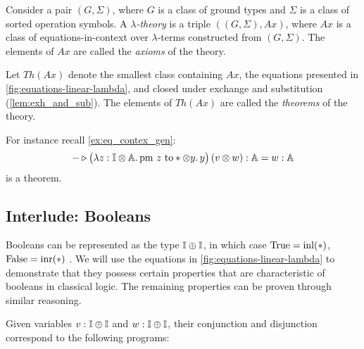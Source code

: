 


\begin{definition} \label{def:linear_lambda_theory}
  Consider a pair $(G, \Sigma)$, where $G$ is a class of ground types and $\Sigma$ is a class of sorted operation symbols. A \emph{$\lambda$-theory} is a triple $((G, \Sigma), Ax)$, where $Ax$ is a class of equations-in-context over $\lambda$-terms constructed from $(G, \Sigma)$. The elements of $Ax$ are called the \emph{axioms} of the theory.
\end{definition}


 Let $Th(Ax)$ denote the smallest class containing $Ax$, the equations presented in \autoref{fig:equations-linear-lambda}, and closed under exchange and substitution (\autoref{lem:exh_and_sub}). The elements of $Th(Ax)$ are called the \emph{theorems} of the theory.

 For instance recall \autoref{ex:eq_contex_gen}: 
 $$- \triangleright \big(\lambda z : \mathbb{I} \otimes \mathbb{A}. \, \text{pm } z \text{ to} * \otimes y. \, y\big) \, (v \otimes w): \mathbb{A} =  w : \mathbb{A} $$
 is a theorem.

\subsection{Interlude: Booleans} \label{subsec:interlude_bool}


Booleans can be represented as the type $\mathbb{I} \oplus \mathbb{I}$, in which case $\text{True} = \mathrm{inl}(*)$, $\text{False} = \mathrm{inr}(*)$ \cite{selinger2013lecture}. We will use the equations in \autoref{fig:equations-linear-lambda} to demonstrate that they possess certain properties that are characteristic of booleans in classical logic. The remaining properties can be proven through similar reasoning. 

Given variables $v : \mathbb{I} \oplus \mathbb{I}$ and $w : \mathbb{I} \oplus \mathbb{I}$, their conjunction and disjunction correspond to the following programs:

